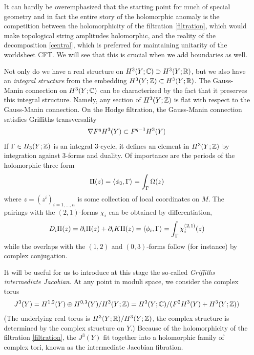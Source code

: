 It can hardly be overemphasized that the starting point for much of
special geometry and in fact the entire story of the holomorphic anomaly 
is the competition between the holomorphicity of the filtration 
\eqref{filtration}, which would make topological string amplitudes
holomorphic, and the reality of the decomposition \eqref{central},
which is preferred for maintaining unitarity of the worldsheet CFT.
We will see that this is crucial when we add boundaries as well.

Not only do we have a real structure on $H^3(Y;{\mathbb C})\supset
H^3(Y;{\mathbb R})$, but we also have an {\it integral structure} from
the embedding $H^3(Y;{\mathbb Z})\subset H^3(Y;{\mathbb R})$. The Gauss-Manin 
connection on $H^3(Y;{\mathbb C})$ can be characterized by the fact that 
it preserves this integral structure. Namely, any section of $H^3(Y;{\mathbb Z})$ 
is flat with respect to the Gauss-Manin connection. On the Hodge 
filtration, the Gauss-Manin connection satisfies Griffiths 
transversality
\begin{equation}
\eqlabel{transverse1}
\nabla F^qH^3(Y)\subset F^{q-1} H^3(Y)
\end{equation}
If $\Gamma\in H_3(Y;{\mathbb Z})$ is an integral 3-cycle, it defines 
an element in $H^3(Y;{\mathbb Z})$ by integration against
3-forms and duality. Of importance are the periods of the
holomorphic three-form
\begin{equation}
\eqlabel{period1}
\Pi(z) = \langle\phi_0,\Gamma\rangle = \int_\Gamma\Omega(z)
\end{equation}
where $z=(z^i)_{i=1,\ldots, n}$ is some collection of local 
coordinates on $M$. The pairings with the $(2,1)$-forms $\chi_i$
can be obtained by differentiation,
\begin{equation}
\eqlabel{period2}
D_i\Pi(z) = \del_i\Pi(z)+\del_i K \Pi(z) 
= \langle\phi_i,\Gamma\rangle = \int_\Gamma \chi_i^{(2,1)}(z)
\end{equation}
while the overlaps with the $(1,2)$ and $(0,3)$-forms follow (for
instance) by complex conjugation.

It will be useful for us to introduce at this stage the so-called
{\it Griffiths intermediate Jacobian}. At any point in moduli space, 
we consider the complex torus
\begin{equation}
\eqlabel{intermediate}
J^3(Y) = H^{1,2}(Y)\oplus H^{0,3}(Y)/H^3(Y;\zet)
= H^3(Y;\complex)/(F^2H^3(Y) + H^3(Y;\zet))
\end{equation}
(The underlying real torus is $H^3(Y;{\mathbb R})/H^3(Y;{\mathbb Z})$, the
complex structure is determined by the complex structure on $Y$.)
Because of the holomorphicity of the filtration \eqref{filtration},
the $J^3(Y)$ fit together into a holomorphic family of complex
tori, known as the intermediate Jacobian fibration.

